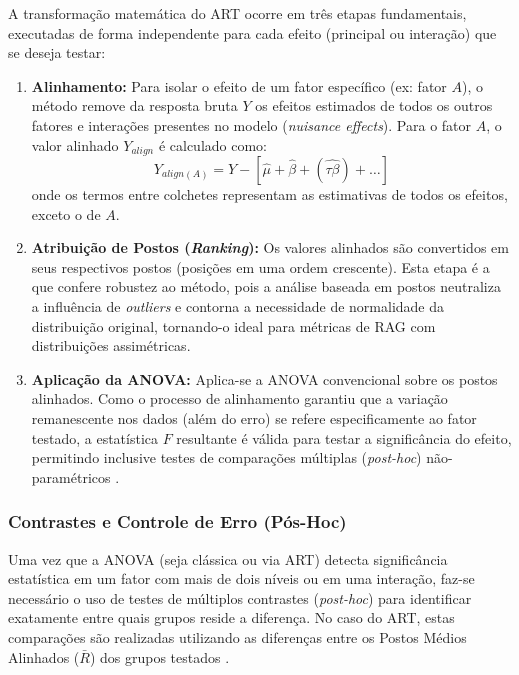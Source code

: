 A transformação matemática do ART ocorre em três etapas fundamentais, executadas de forma independente para cada efeito (principal ou interação) que se deseja testar:

\begin{enumerate}
  \item \textbf{Alinhamento:} Para isolar o efeito de um fator específico (ex: fator $A$), o método remove da resposta bruta $Y$ os efeitos estimados de todos os outros fatores e interações presentes no modelo (\textit{nuisance effects}). Para o fator $A$, o valor alinhado $Y_{align}$ é calculado como:
    \begin{equation}
      Y_{align(A)} = Y - \left[ \hat{\mu} + \hat{\beta} + (\widehat{\tau\beta}) + \dots \right]
    \end{equation}
    onde os termos entre colchetes representam as estimativas de todos os efeitos, exceto o de $A$.

  \item \textbf{Atribuição de Postos (\textit{Ranking}):} Os valores alinhados são convertidos em seus respectivos postos (posições em uma ordem crescente).  Esta etapa é a que confere robustez ao método, pois a análise baseada em postos neutraliza a influência de \textit{outliers} e contorna a necessidade de normalidade da distribuição original, tornando-o ideal para métricas de RAG com distribuições assimétricas.

  \item \textbf{Aplicação da ANOVA:} Aplica-se a ANOVA convencional sobre os postos alinhados. Como o processo de alinhamento garantiu que a variação remanescente nos dados (além do erro) se refere especificamente ao fator testado, a estatística $F$ resultante é válida para testar a significância do efeito, permitindo inclusive testes de comparações múltiplas (\textit{post-hoc}) não-paramétricos \citep{10.1145/3472749.3474784}.
\end{enumerate}

\subsubsection{Contrastes e Controle de Erro (Pós-Hoc)}

Uma vez que a ANOVA (seja clássica ou via ART) detecta significância estatística em um fator com mais de dois níveis ou em uma interação, faz-se necessário o uso de testes de múltiplos contrastes (\textit{post-hoc}) para identificar exatamente entre quais grupos reside a diferença. No caso do ART, estas comparações são realizadas utilizando as diferenças entre os Postos Médios Alinhados ($\bar{R}$) dos grupos testados \citep{10.1145/3472749.3474784}.

